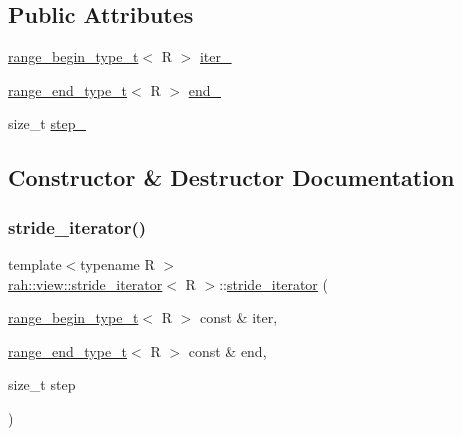 \subsection*{Public Attributes}
\begin{DoxyCompactItemize}
\item 
\mbox{\hyperlink{namespacerah_afa7f59d1f37c7b9d9caed37551be9eaa}{range\+\_\+begin\+\_\+type\+\_\+t}}$<$ R $>$ \mbox{\hyperlink{structrah_1_1view_1_1stride__iterator_a65e7fa92e8026ce48e3c132e808e9ffc}{iter\+\_\+}}
\item 
\mbox{\hyperlink{namespacerah_a3042a09fc211e86eea6771d01375d263}{range\+\_\+end\+\_\+type\+\_\+t}}$<$ R $>$ \mbox{\hyperlink{structrah_1_1view_1_1stride__iterator_abd80314a0e4408629e33f43b5272f74e}{end\+\_\+}}
\item 
size\+\_\+t \mbox{\hyperlink{structrah_1_1view_1_1stride__iterator_a1b2e6cfb0631cde24284f56b17a4452c}{step\+\_\+}}
\end{DoxyCompactItemize}


\subsection{Constructor \& Destructor Documentation}
\mbox{\label{structrah_1_1view_1_1stride__iterator_a47ddd2ce0f295fa825919f04431d64a9}} 
\subsubsection{\texorpdfstring{stride\_iterator()}{stride\_iterator()}}
{\footnotesize\ttfamily template$<$typename R $>$ \\
\mbox{\hyperlink{structrah_1_1view_1_1stride__iterator}{rah\+::view\+::stride\+\_\+iterator}}$<$ R $>$\+::\mbox{\hyperlink{structrah_1_1view_1_1stride__iterator}{stride\+\_\+iterator}} (\begin{DoxyParamCaption}\item[{\mbox{\hyperlink{namespacerah_afa7f59d1f37c7b9d9caed37551be9eaa}{range\+\_\+begin\+\_\+type\+\_\+t}}$<$ R $>$ const \&}]{iter,  }\item[{\mbox{\hyperlink{namespacerah_a3042a09fc211e86eea6771d01375d263}{range\+\_\+end\+\_\+type\+\_\+t}}$<$ R $>$ const \&}]{end,  }\item[{size\+\_\+t}]{step }\end{DoxyParamCaption})\hspace{0.3cm}{\ttfamily [inline]}}



